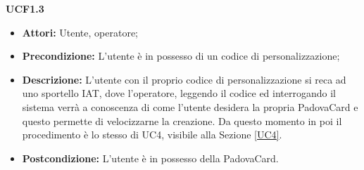 \textbf{UCF1.3}
\begin{itemize}
\item \textbf{Attori:} Utente, operatore;
\item \textbf{Precondizione:} L'utente è in possesso di un codice di personalizzazione;
\item \textbf{Descrizione:} L'utente con il proprio codice di personalizzazione si reca ad uno sportello IAT, dove l'operatore, leggendo il codice ed interrogando il sistema verrà a conoscenza di come l'utente desidera la propria PadovaCard e questo permette di velocizzarne la creazione. Da questo momento in poi il procedimento è lo stesso di UC4, visibile alla Sezione \ref{UC4}.

\item \textbf{Postcondizione:} L'utente è in possesso della PadovaCard.
\end{itemize}

